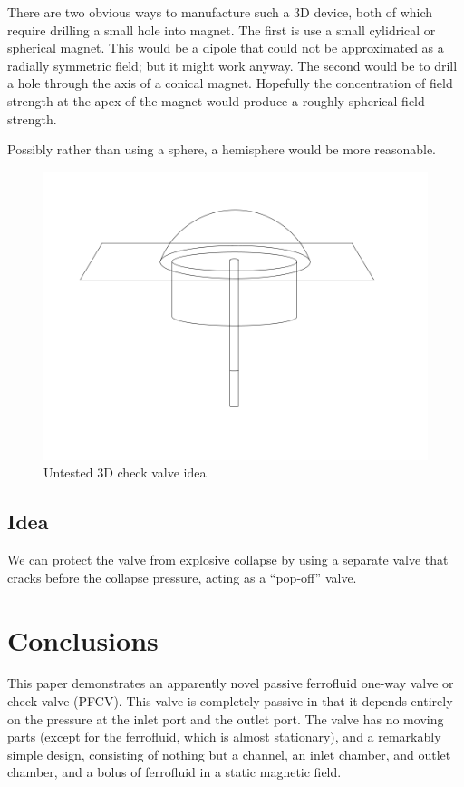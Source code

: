 \documentclass[]{asme2ej}
\begin{document}
There are two obvious ways to manufacture such a 3D device, both of which require
drilling a small hole into magnet. The first is use a small cylidrical or spherical
magnet. This would be a dipole that could not be approximated as a radially
symmetric field; but it might work anyway.  The second would be to drill a hole
through the axis of a conical magnet. Hopefully the concentration of field strength
at the apex of the magnet would produce a roughly spherical field strength.

Possibly rather than using a sphere, a hemisphere would be more reasonable.

\begin{figure}
\centerline{\includegraphics[width=6in]{figure/3DCheckValve.png}}
\caption{Untested 3D check valve idea}
\label{fig:3dcheckvalve}
\end{figure}

\subsection{Idea}

We can protect the valve from explosive collapse by using a separate
valve that cracks before the collapse pressure, acting as a ``pop-off''
valve.





\section{Conclusions}

This paper demonstrates an apparently novel passive ferrofluid one-way
valve or check valve (PFCV). This valve is completely passive in that
it depends entirely on the pressure at the inlet port and the outlet
port. The valve has no moving parts (except for the ferrofluid, which
is almost stationary), and a remarkably simple design, consisting of
nothing but a channel, an inlet chamber, and outlet chamber,
and a bolus of ferrofluid in a
static magnetic field.
\end{document}
